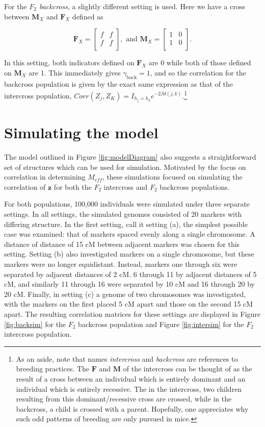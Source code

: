 \documentclass{article}
\newcommand{\ve}[1]{\mathbf{#1}}           %
\newcommand{\m}[1]{\mathbf{#1}}               %
\begin{document}
For the \textit{$F_2$ backcross}, a slightly different setting is used. Here we have a cross between $\m{M}_X$ and $\m{F}_X$ defined as

$$\m{F}_X = \begin{bmatrix}
  f & f \\
  f & f \\
\end{bmatrix}, \text{ and }
\m{M}_X = \begin{bmatrix}
  1 & 0 \\
  1 & 0 \\
\end{bmatrix}.$$

\noindent In this setting, both indicators defined on $\m{F}_X$ are 0 while both of those defined on $\m{M}_X$ are 1. This immediately gives $\gamma_{\text{back}} = 1$, and so the correlation for the backcross population is given by the exact same expression as that of the intercross population, $Corr(Z_j, Z_K) = I_{h_j = h_k} e^{-2 \beta d(j,k)}$.\footnote{As an aside, note that names \textit{intercross} and \textit{backcross} are references to breeding practices. The $\m{F}$ and $\m{M}$ of the intercross can be thought of as the result of a cross between an individual which is entirely dominant and an individual which is entirely recessive. The in the intercross, two children resulting from this dominant/recessive cross are crossed, while in the backcross, a child is crossed with a parent. Hopefully, one appreciates why such odd patterns of breeding are only pursued in mice.}

\section{Simulating the model} \label{subsec:sim}

The model outlined in Figure \ref{fig:modelDiagram} also suggests a straightforward set of structures which can be used for simulation. Motivated by the focus on correlation in determining $M_{eff}$, these simulations focused on simulating the correlation of $\ve{z}$ for both the $F_2$ intercross and $F_2$ backcross populations.

For both populations, 100,000 individuals were simulated under three separate settings. In all settings, the simulated genomes consisted of 20 markers with differing structure. In the first setting, call it setting (a), the simplest possible case was examined: that of markers spaced evenly along a single chromosome. A distance of distance of 15 cM between adjacent markers was chosen for this setting. Setting (b) also investigated markers on a single chromosome, but these markers were no longer equidistant. Instead, markers one through six were separated by adjacent distances of 2 cM. 6 through 11 by adjacent distances of 5 cM, and similarly 11 through 16 were separated by 10 cM and 16 through 20 by 20 cM. Finally, in setting (c) a genome of two chromosomes was investigated, with the markers on the first placed 5 cM apart and those on the second 15 cM apart. The resulting correlation matrices for these settings are displayed in Figure \ref{fig:backsim} for the $F_2$ backcross population and Figure \ref{fig:intersim} for the $F_2$ intercross population.
\end{document}
